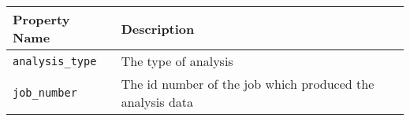 \begin{tabularx}{\textwidth}{l|X}
\hline
 Property Name   & Description                                               \\
\hline
 \texttt{analysis\_type}   & The type of analysis                                      \\
 \texttt{job\_number}      & The id number of the job which produced the analysis data \\
\hline
\end{tabularx}